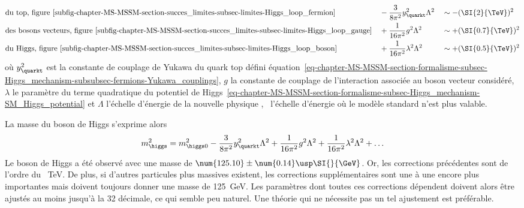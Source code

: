 \begin{align}
\allowdisplaybreaks
& \text{du top, figure~\ref{subfig-chapter-MS-MSSM-section-succes_limites-subsec-limites-Higgs_loop_fermion}} && -\frac{3}{8\pi^2} y_{\quarkt}^2 \Lambda^2 && \sim -(\SI{2}{\TeV})^2 \\
& \text{des bosons vecteurs, figure~\ref{subfig-chapter-MS-MSSM-section-succes_limites-subsec-limites-Higgs_loop_gauge}} && +\frac{1}{16\pi^2} g^2 \Lambda^2 && \sim +(\SI{0.7}{\TeV})^2 \\
& \text{du Higgs, figure~\ref{subfig-chapter-MS-MSSM-section-succes_limites-subsec-limites-Higgs_loop_boson}} && +\frac{1}{16\pi^2} \lambda^2 \Lambda^2 && \sim +(\SI{0.5}{\TeV})^2
\end{align}
où
$y_{\quarkt}^2$ est la constante de couplage de Yukawa du quark top défini équation~\eqref{eq-chapter-MS-MSSM-section-formalisme-subsec-Higgs_mechanism-subsubsec-fermions-Yukawa_couplings},
$g$ la constante de couplage de l'interaction associée au boson vecteur considéré,
$\lambda$ le paramètre du terme quadratique du potentiel de Higgs~\eqref{eq-chapter-MS-MSSM-section-formalisme-subsec-Higgs_mechanism-SM_Higgs_potential} et
$\Lambda$ l'échelle d'énergie de la \og nouvelle physique \fg, \ie\ l'échelle d'énergie où le modèle standard n'est plus valable.
\par La masse du boson de Higgs s'exprime alors
\begin{equation}
m_{\higgs}^2 = m_{\higgs 0}^2 -\frac{3}{8\pi^2} y_{\quarkt}^2 \Lambda^2  +\frac{1}{16\pi^2} g^2 \Lambda^2 + \frac{1}{16\pi^2} \lambda^2 \Lambda^2 + \ldots
\end{equation}
Le boson de Higgs a été observé avec une masse de $\num{125.10}\pm\num{0.14}\usp\SI{}{\GeV}$.
Or, les corrections précédentes sont de l'ordre du \SI{}{\TeV}.
De plus, si d'autres particules plus massives existent, les corrections supplémentaires sont une à une encore plus importantes mais doivent toujours donner une masse de \SI{125}{\GeV}.
Les paramètres dont toutes ces corrections dépendent doivent alors être ajustés au moins jusqu'à la 32 décimale, ce qui semble peu naturel.
Une théorie qui ne nécessite pas un tel ajustement est préférable.
